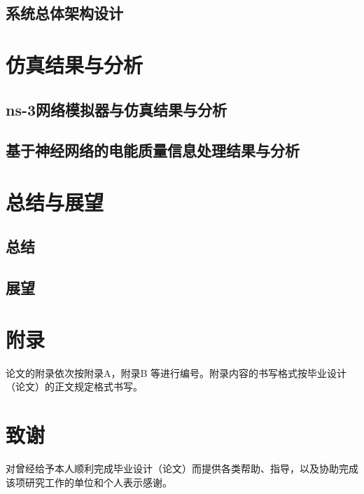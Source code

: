 \documentclass[UTF8，a4paper]{ctexrep}
\begin{document}
\section{系统总体架构设计}

\chapter{仿真结果与分析}{\heiti{}}
\thispagestyle{fancy}
\section{ns-3网络模拟器与仿真结果与分析}
\section{基于神经网络的电能质量信息处理结果与分析}
\chapter{总结与展望}{\heiti{}}
\thispagestyle{fancy}
\section{总结}
\section{展望}
\clearpage

\thispagestyle{fancy}
\chapter*{附\qquad 录}{\heiti{}}
\thispagestyle{fancy}
论文的附录依次按附录A，附录B 等进行编号。附录内容的书写格式按毕业设计（论文）的正文规定格式书写。
\chapter*{致\qquad 谢}{\heiti{}}
\thispagestyle{fancy}
对曾经给予本人顺利完成毕业设计（论文）而提供各类帮助、指导，以及协助完成该项研究工作的单位和个人表示感谢。
\end{document}
